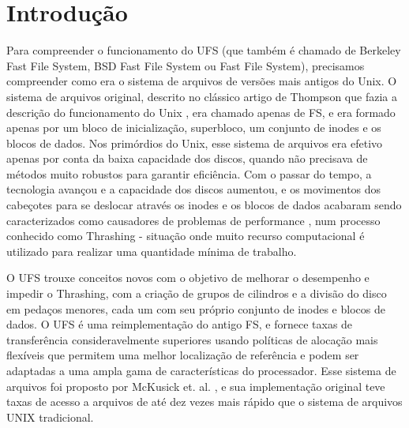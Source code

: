 \section{Introdução}

Para compreender o funcionamento do UFS (que também é chamado de Berkeley Fast File System, BSD Fast File System ou Fast File System), precisamos compreender como era o sistema de arquivos de versões mais antigos do Unix. O sistema de arquivos original, descrito no clássico artigo de Thompson que fazia a descrição do funcionamento do Unix \cite{thompson1978unix}, era chamado apenas de FS, e era formado apenas por um bloco de inicialização, superbloco, um conjunto de inodes e os blocos de dados. Nos primórdios do Unix, esse sistema de arquivos era efetivo apenas por conta da baixa capacidade dos discos, quando não precisava de métodos muito robustos para garantir eficiência. Com o passar do tempo, a tecnologia avançou e a capacidade dos discos aumentou, e os movimentos dos cabeçotes para se deslocar através os inodes e os blocos de dados acabaram sendo caracterizados como causadores de problemas de performance \cite{tanenbaum2015modern}, num processo conhecido como Thrashing - situação onde muito recurso computacional é utilizado para realizar uma quantidade mínima de trabalho.

O UFS trouxe conceitos novos com o objetivo de melhorar o desempenho e impedir o Thrashing, com a criação de grupos de cilindros e a divisão do disco em pedaços menores, cada um com seu próprio conjunto de inodes e blocos de dados. O UFS é uma reimplementação do antigo FS, e fornece taxas de transferência consideravelmente superiores usando políticas de alocação mais flexíveis que permitem uma melhor localização de referência e podem ser adaptadas a uma ampla gama de características do processador. Esse sistema de arquivos foi proposto por McKusick et. al. \cite{mckusick1984fast}, e sua implementação original teve taxas de acesso a arquivos de até dez vezes mais rápido que o sistema de arquivos UNIX tradicional.

